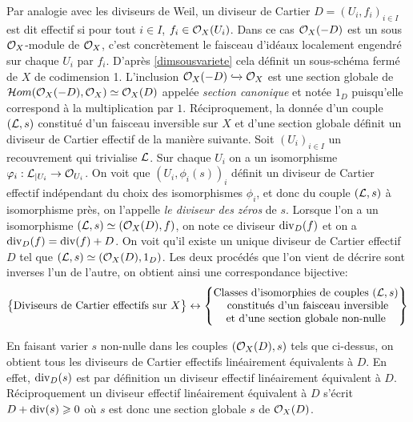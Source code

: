 Par analogie avec les diviseurs de Weil, un diviseur de Cartier $D=(U_i, f_i)_{i\in I}$ est dit effectif si pour tout $i\in I$, $f_i\in \mathcal{O}_X(U_i)$. Dans ce cas $\mathcal{O}_X(-D)$ est un sous $\mathcal{O}_X$-module de $\mathcal{O}_X$, c'est concrètement le faisceau d'idéaux localement engendré sur chaque $U_i$ par $f_i$. D'après \ref{dimsousvariete} cela définit un sous-schéma fermé de $X$ de codimension 1. L'inclusion $\mathcal{O}_X(-D)\xhookrightarrow{} \mathcal{O}_X$ est une section globale de $\mathcal{H} om(\mathcal{O}_X(-D), \mathcal{O}_X)\simeq \mathcal{O}_X(D)$ appelée \textit{section canonique} et notée $1_D$ puisqu'elle correspond à la multiplication par $1$. Réciproquement, la donnée d'un couple $(\mathcal{L}, s)$ constitué d'un faisceau inversible sur $X$ et d'une section globale définit un diviseur de Cartier effectif de la manière suivante. Soit $(U_i)_{i\in I}$ un recouvrement qui trivialise $\mathcal{L}$. Sur chaque $U_i$ on a un isomorphisme $\varphi_i:\mathcal{L}_{|U_i}\rightarrow\mathcal{O}_{U_i}$. On voit que $(U_i,\phi_i(s))_i$ définit un diviseur de Cartier effectif indépendant du choix des isomorphismes $\phi_i$, et donc du couple $(\mathcal{L},s)$ à isomorphisme près, on l'appelle \textit{le diviseur des zéros} de $s$. Lorsque l'on a un isomorphisme $(\mathcal{L},s)\simeq (\mathcal{O}_X(D),f)$, on note ce diviseur $\operatorname{div}_D(f)$ et on a $\operatorname{div}_D(f)=\operatorname{div}(f)+D$. On voit qu'il existe un unique diviseur de Cartier effectif $D$ tel que $(\mathcal{L},s)\simeq(\mathcal{O}_X(D),1_D)$. Les deux procédés que l'on vient de décrire sont inverses l'un de l'autre, on obtient ainsi une correspondance bijective:
$$
\left\{
\begin{matrix}
\text{Diviseurs de Cartier effectifs sur }X
\end{matrix}
\right\}
\leftrightarrow
\left\{
\begin{matrix}
\text{Classes d'isomorphies de couples }(\mathcal{L}, s)\\
\text{ constitués d'un faisceau inversible}\\
\text{et d'une section globale non-nulle}
\end{matrix}
\right\}
$$

En faisant varier $s$ non-nulle dans les couples $(\mathcal{O}_X(D),s)$ tels que ci-dessus, on obtient tous les diviseurs de Cartier effectifs linéairement équivalents à $D$. En effet, $\operatorname{div}_D(s)$ est par définition un diviseur effectif linéairement équivalent à $D$. Réciproquement un diviseur effectif linéairement équivalent à $D$ s'écrit $D+\operatorname{div}(s)\geqslant 0$ où $s$ est donc une section globale $s$ de $\mathcal{O}_X(D)$.

